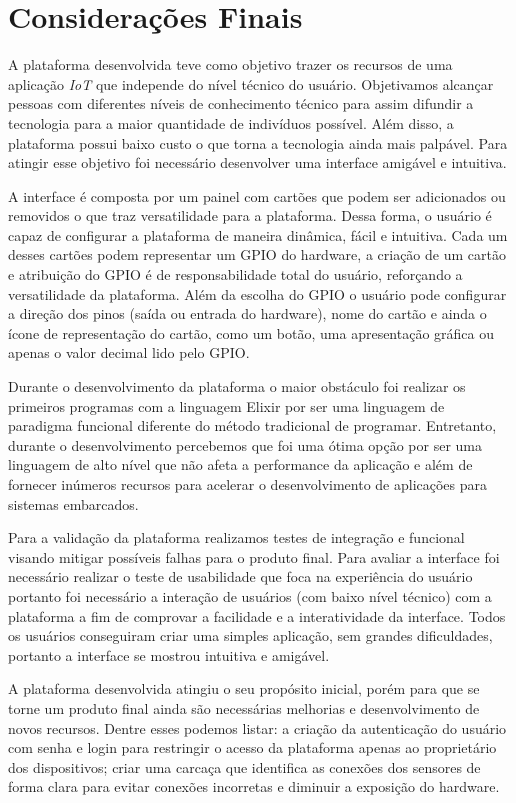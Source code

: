 \documentclass[../../layout.tex]{subfiles}
\begin{document}
\chapter{Considerações Finais}
\hspace*{3em}A plataforma desenvolvida teve como objetivo trazer os recursos de uma aplicação \emph{IoT} que independe do nível técnico do usuário. Objetivamos alcançar pessoas com diferentes níveis de conhecimento técnico para assim difundir a tecnologia para a maior quantidade de indivíduos possível. Além disso, a plataforma possui baixo custo o que torna a tecnologia ainda mais palpável. Para atingir esse objetivo foi necessário desenvolver uma interface amigável e intuitiva.\par
A interface é composta por um painel com cartões que podem ser adicionados ou removidos o que traz versatilidade para a plataforma. Dessa forma, o usuário é capaz de configurar a plataforma de maneira dinâmica, fácil e intuitiva. Cada um desses cartões podem representar um GPIO do hardware, a criação de um cartão e atribuição do GPIO é de responsabilidade total do usuário, reforçando a versatilidade da plataforma. Além da escolha do GPIO o usuário pode configurar a direção dos pinos (saída ou entrada do hardware), nome do cartão e ainda o ícone de representação do cartão, como um botão, uma apresentação gráfica ou apenas o valor decimal lido pelo GPIO.\par
Durante o desenvolvimento da plataforma o maior obstáculo foi realizar os primeiros programas com a linguagem Elixir por ser uma linguagem de paradigma funcional diferente do método tradicional de programar. Entretanto, durante o desenvolvimento percebemos que foi uma ótima opção por ser uma linguagem de alto nível que não afeta a performance da aplicação e além de fornecer inúmeros recursos para acelerar o desenvolvimento de aplicações para sistemas embarcados.\par
Para a validação da plataforma realizamos testes de integração e funcional visando mitigar possíveis falhas para o produto final. Para avaliar a interface foi necessário realizar o teste de usabilidade que foca na experiência do usuário  portanto foi necessário a interação de usuários (com baixo nível técnico) com a plataforma a fim de comprovar a facilidade e a interatividade da interface. Todos os usuários conseguiram criar uma simples aplicação, sem grandes dificuldades, portanto a interface se mostrou  intuitiva e amigável.\par
A plataforma desenvolvida atingiu o seu propósito inicial, porém para que se torne um produto final ainda são necessárias melhorias e desenvolvimento de novos recursos. Dentre esses podemos listar: a criação da autenticação do usuário com senha e login para restringir o acesso da plataforma apenas ao proprietário dos dispositivos; criar uma carcaça que identifica as conexões dos sensores de forma clara para evitar conexões incorretas e diminuir a exposição do hardware.\par 
\end{document}
